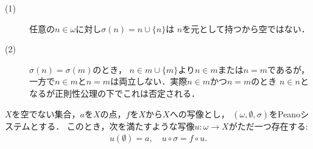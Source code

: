 	\begin{prf}\mbox{}
		\begin{description}
			\item[(1)] 任意の$n \in \omega$に対し$\sigma(n) = n \cup \{n\}$は
				$n$を元として持つから空ではない．
				
			\item[(2)] $\sigma(n) = \sigma(m)$のとき，
				$n \in m \cup \{m\}$より$n \in m$または$n = m$であるが，
				一方で$n \in m$と$n = m$は両立しない．実際$n \in m$かつ$n=m$のとき
				$n \in n$となるが正則性公理の下でこれは否定される．
		\end{description}
	\end{prf}
	
	\begin{screen}
		\begin{thm}[再帰定理]
			$X$を空でない集合，$a$を$X$の点，$f$を$X$から$X$への写像とし，
			$(\omega,\emptyset,\sigma)$をPeanoシステムとする．
			このとき，次を満たすような写像$u:\omega \longrightarrow X$がただ一つ存在する:
			\begin{align}
				u(\emptyset) = a,\quad u \circ \sigma = f \circ u.
			\end{align}
		\end{thm}
	\end{screen}
	
